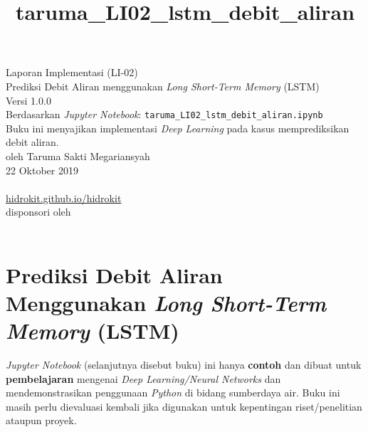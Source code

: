 \documentclass[11pt]{article}
\title{taruma\_LI02\_lstm\_debit\_aliran}
\begin{document}
    

	\begin{titlepage}
		\vspace*{\fill}
		\begin{center}
 		\normalsize Laporan Implementasi (LI-02)\\
		\huge Prediksi Debit Aliran menggunakan \emph{Long Short-Term Memory} (LSTM) \\ 
		\normalsize Versi 1.0.0 \\[0.2cm]
      	\small Berdasarkan \emph{Jupyter Notebook}: \texttt{taruma\_LI02\_lstm\_debit\_aliran.ipynb} \\[0.5cm]
      	\normalsize Buku ini menyajikan implementasi \emph{Deep Learning} pada kasus memprediksikan debit aliran. \\[0.5cm]
		\normalsize oleh Taruma Sakti Megariansyah\\[0.5cm]
      	\normalsize 22 Oktober 2019\\[1cm]
    	\\
      	\normalsize \href{https://hidrokit.github.io/hidrokit}{hidrokit.github.io/hidrokit}  \\[0.5cm]
      	\small disponsori oleh \\[0.2cm]
    	\href{https://www.fiako.co.id}{}\\
		\end{center}
    	\vspace*{\fill}
	\end{titlepage}
    
    

    
    \hypertarget{prediksi-debit-aliran-menggunakan-long-short-term-memory-lstm}{%
\section{\texorpdfstring{Prediksi Debit Aliran Menggunakan \emph{Long
Short-Term Memory}
(LSTM)}{Prediksi Debit Aliran Menggunakan Long Short-Term Memory (LSTM)}}\label{prediksi-debit-aliran-menggunakan-long-short-term-memory-lstm}}

\emph{Jupyter Notebook} (selanjutnya disebut buku) ini hanya
\textbf{contoh} dan dibuat untuk \textbf{pembelajaran} mengenai
\emph{Deep Learning/Neural Networks} dan mendemonstrasikan penggunaan
\emph{Python} di bidang sumberdaya air. Buku ini masih perlu dievaluasi
kembali jika digunakan untuk kepentingan riset/penelitian ataupun
proyek.
\end{document}
